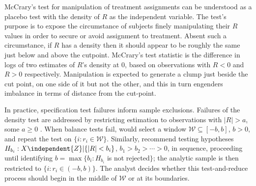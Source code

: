 McCrary's test for manipulation of treatment assignments
\citeyearpar{mccrary2008manipulation} can be understood as a %
placebo test with the density of $R$ as the independent variable.
The test's
purpose is to expose the circumstance of subjects finely manipulating their
$R$ values in order to secure or avoid assignment to treatment.  Absent
such a circumstance, if $R$ has a density then it should appear to be
roughly the same just below and above the cutpoint.  McCrary's
\citeyearpar{mccrary2008manipulation} test statistic is the difference
in logs of two estimates of $R$'s density at 0, based on observations
with $R<0$ and $R>0$ respectively.
Manipulation is expected to generate a clump just beside the cut
point, on one side of it but not the other, and this in turn engenders
imbalance in terms of distance from the cut-point.


In practice, specification test failures inform sample exclusions.
Failures of the density test are addressed by restricting
estimation to observations with $|R|>a$, some $a \geq 0$
\citep[e.g.,][]{barrecaetal2011birthweightRDD,eggers2014validity}.
When balance tests fail,
\citet{lee2010regression} would select a window
$\mathcal{W} \subseteq [-b, b]$, $b>0$, %
and repeat the test on $\{i : r_{i} \in \mathcal{W}\}$. Similarly,
\citet{cattaneo2014randomization} recommend testing hypotheses
$H_{b_{i}}: {X} \independent {Z}| \{|R| < b_{i}\}$, $b_1 > b_2 > \cdots >0$, in sequence,
proceeding until identifying  $b = \max \{ b_i: H_{b_{i}}$ is not rejected$\}$;
the analytic sample is then restricted to  $\{i: r_{i} \in (-b,b)\}$.
The analyst decides whether this test-and-reduce process
should begin in the middle of $\mathcal{W}$ or at its boundaries.




